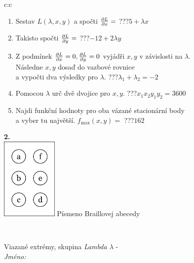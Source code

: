 \documentclass[10pt]{report}
\begin{document}
\begin{tabular}{c:c}
\begin{minipage}[c][104.5mm][t]{0.5\linewidth}
\begin{center}
\begin{minipage}{0.79\linewidth}
\begin{center}
\begin{varwidth}{\linewidth}
\begin{enumerate}
\item Sestav $L(\lambda,x,y)$ a spočti $\pdv{L}{x}=$\quad \dotfill\; ???\;\dotfill \quad $5+\lambda x$
\item Takisto spočti $\pdv{L}{y}=$\quad \dotfill\; ???\;\dotfill \quad $-12+2\lambda y$
\item Z podmínek $\pdv{L}{x}=0 , \pdv{L}{y}=0$ vyjádři $x,y$ v závislosti na $\lambda$.\\ \phantom{xxxxxx}Následne $x,y$ dosaď do vazbové rovnice\\ \phantom{xxxxxx}a vypočti dva výsledky pro $\lambda$.\quad \dotfill\; ???\;\dotfill \quad $\lambda_1+\lambda_2=-2$
\item Pomocou $\lambda$ urč dvě dvojice pro $x,y$.\quad \dotfill\; ???\;\dotfill \quad $x_1 x_2 y_1 y_2=3600$
\item Najdi funkční hodnoty pro oba vázané stacionární body\\ \phantom{xxxxxx}a vyber tu najvětší. $f_{\text{max}}(x,y)=$\quad \dotfill\; ???\;\dotfill \quad $162$
\end{enumerate}
\end{varwidth}
\end{center}
\end{minipage}
\begin{minipage}{0.20\linewidth}
\begin{center}
{\Huge\bfseries 2.} \\[2mm]
\includegraphics[height=40mm]{../images/braille.png}
{\small Písmeno Braillovej abecedy}
\end{center}
\end{minipage}
\end{center}
\end{minipage}
\\ \hdashline
\begin{minipage}[c][104.5mm][t]{0.5\linewidth}
\begin{center}
\vspace{7mm}
{\huge Viazané extrémy, skupina \textit{Lambda $\lambda$} -}\\[5mm]
\textit{Jméno:}\phantom{xxxxxxxxxxxxxxxxxxxxxxxxxxxxxxxxxxxxxxxxxxxxxxxxxxxxxxxxxxxxxxxxx}\\[5mm]

\end{center}
\end{minipage}
\end{tabular}
\end{document}
